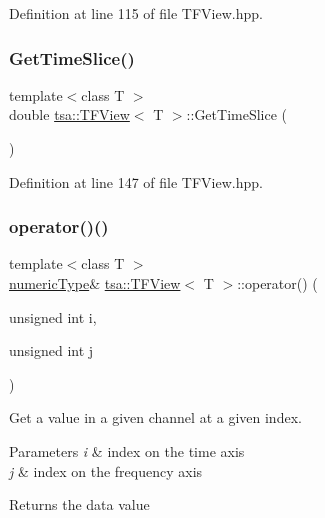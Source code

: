 Definition at line 115 of file T\+F\+View.\+hpp.

\mbox{\label{classtsa_1_1_t_f_view_adcf936687b668125c123aae1ae31bb94}} 
\subsubsection{\texorpdfstring{Get\+Time\+Slice()}{GetTimeSlice()}}
{\footnotesize\ttfamily template$<$class T $>$ \\
double \hyperlink{classtsa_1_1_t_f_view}{tsa\+::\+T\+F\+View}$<$ T $>$\+::Get\+Time\+Slice (\begin{DoxyParamCaption}{ }\end{DoxyParamCaption})\hspace{0.3cm}{\ttfamily [inline]}}



Definition at line 147 of file T\+F\+View.\+hpp.

\mbox{\label{classtsa_1_1_t_f_view_a6f20d608542849e71c31a1abd56a92a6}} 
\subsubsection{\texorpdfstring{operator()()}{operator()()}}
{\footnotesize\ttfamily template$<$class T $>$ \\
\hyperlink{classtsa_1_1_t_f_view_a9dcd740f5d29edefd0a181917a9c700b}{numeric\+Type}\& \hyperlink{classtsa_1_1_t_f_view}{tsa\+::\+T\+F\+View}$<$ T $>$\+::operator() (\begin{DoxyParamCaption}\item[{unsigned int}]{i,  }\item[{unsigned int}]{j }\end{DoxyParamCaption})\hspace{0.3cm}{\ttfamily [inline]}}

Get a value in a given channel at a given index.


\begin{DoxyParams}{Parameters}
{\em i} & index on the time axis \\
\hline
{\em j} & index on the frequency axis\\
\hline
\end{DoxyParams}
\begin{DoxyReturn}{Returns}
the data value 
\end{DoxyReturn}


